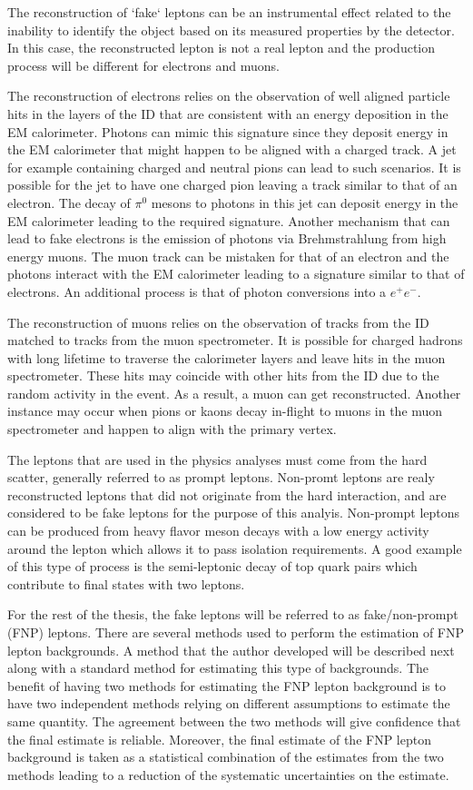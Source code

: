 The reconstruction of `fake` leptons can be an instrumental effect related to the inability to identify the object based on 
its measured properties by the detector. In this case, the reconstructed lepton is not a real lepton and the production process 
will be different for electrons and muons.

The reconstruction of electrons relies on the observation of well aligned particle hits in the layers of the ID that are consistent 
with an energy deposition in the EM calorimeter. Photons can mimic this signature since they deposit energy in the EM 
calorimeter that might happen to be aligned with a charged track. A jet for example containing charged and neutral pions can 
lead to such scenarios. It is possible for the jet to have one charged pion leaving a track similar to that of an electron.
The decay of $\pi^0$ mesons to photons in this jet can deposit energy in the EM calorimeter leading to the required signature.
Another mechanism that can lead to fake electrons is the emission of photons via Brehmstrahlung from high energy muons. 
The muon track can be mistaken for that of an electron and the photons interact with the EM calorimeter leading to a
signature similar to that of electrons. An additional process is that of photon conversions into a $e^+e^-$.

The reconstruction of muons relies on the observation of tracks from the ID matched to tracks from the muon spectrometer.
It is possible for charged hadrons with long lifetime to traverse the calorimeter layers and leave hits in the muon spectrometer.
These hits may coincide with other hits from the ID due to the random activity in the event. As a result, a muon can get
reconstructed. Another instance may occur when pions or kaons decay in-flight to muons in the muon spectrometer
and happen to align with the primary vertex.

The leptons that are used in the physics analyses must come from the hard scatter, generally referred to as prompt leptons.
Non-promt leptons are realy reconstructed leptons that did not originate from 
the hard interaction, and are considered to be fake leptons for the purpose 
of this analyis. Non-prompt leptons can be produced from heavy flavor meson decays with a low energy activity 
around the lepton which allows it to pass isolation requirements. A good example of this type of process is the 
semi-leptonic decay of top quark pairs which contribute to final states with two leptons. 

For the rest of the thesis, the fake leptons will be referred to as fake/non-prompt (FNP) leptons.
There are several methods used to perform the estimation of FNP lepton backgrounds. 
A method that the author developed will be described next along with a standard method for estimating this type of backgrounds.
The benefit of having two methods for estimating the FNP lepton background is to
have two independent methods relying on different assumptions to estimate the 
same quantity. The agreement between the two methods will give confidence 
that the final estimate is reliable. 
Moreover, the final estimate of the FNP lepton background is taken as a statistical combination of the estimates from the 
two methods leading to a reduction of the systematic uncertainties on the estimate.
